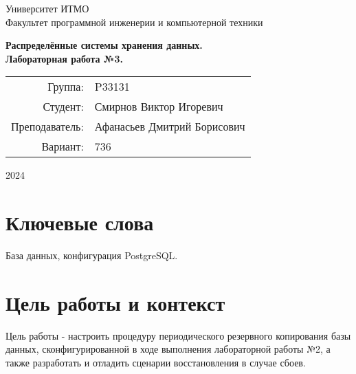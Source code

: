 \documentclass{article}
\begin{document}
\begin{titlepage}
    \begin{center}
        \begin{spacing}{1.4}
            \large{Университет ИТМО} \\
            \large{Факультет программной инженерии и компьютерной техники} \\
        \end{spacing}
        \vfill
        \textbf{
            \huge{Распределённые системы хранения данных.} \\
            \huge{Лабораторная работа №3.} \\
        }
    \end{center}
    \vfill
    \begin{center}
        \begin{tabular}{r l}
            Группа:        & P33131                      \\
            Студент:       & Смирнов Виктор Игоревич     \\
            Преподаватель: & Афанасьев Дмитрий Борисович \\
            Вариант:       & 736                         \\
        \end{tabular}
    \end{center}
    \vfill
    \begin{center}
        \begin{large}
            2024
        \end{large}
    \end{center}
\end{titlepage}

\section*{Ключевые слова}

База данных, конфигурация PostgreSQL.

\tableofcontents

\section{Цель работы и контекст}

Цель работы - настроить процедуру периодического резервного копирования базы данных, сконфигурированной в ходе выполнения лабораторной работы №2, а также разработать и отладить сценарии восстановления в случае сбоев.
\end{document}
